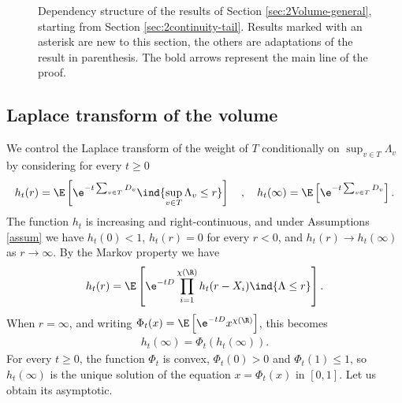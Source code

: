 \documentclass[10pt,a4paper]{article}
\begin{document}
\begin{figure}
\begin{center}
\end{center}
\caption{Dependency structure of the results of Section \ref{sec:2Volume-general}, starting from Section \ref{sec:2continuity-tail}. Results marked with an asterisk are new to this section, the others are adaptations of the result in parenthesis. The bold arrows represent the main line of the proof.}
\label{fig:structure-sec-volume}
\end{figure}





\subsection{Laplace transform of the volume}
\label{sec:2Laplace-volume-without-displacement}


We control the Laplace transform of the weight of $T$ conditionally on $\sup_{v\in T} \Lambda_v$ by considering for every $t\geq 0$
\[h_t(r) = \E\left[ \e^{-t \sum_{v\in T} D_v} \ind{\sup_{v\in T} \Lambda_v \leq r}\right] \quad , \quad h_t(\infty) = \E\left[ \e^{-t \sum_{v\in T} D_v}\right] . \]
The function $h_t$ is increasing and right-continuous, and under Assumptions \ref{assum} we have $h_t(0)<1$, $h_t(r)=0$ for every $r<0$, and $h_t(r)\to h_t(\infty)$ as $r\to\infty$. By the Markov property we have
\begin{equation}\label{eq:2convolution-equation-1}
h_t(r) = \E\left[ \e^{-t D} \prod_{i=1}^{\chi(\R)} h_t(r-X_i) \ind{\Lambda\leq r} \right] .
\end{equation}
When $r=\infty$, and writing $\Phi_t(x) = \E\left[\e^{-tD} x^{\chi(\R)}\right]$, this becomes 
\begin{align}\label{eq:2htinf-point-fixe}
h_t(\infty) = \Phi_t(h_t(\infty)) .
\end{align}
For every $t\geq 0$, the function $\Phi_t$ is convex, $\Phi_t(0)>0$ and $\Phi_t(1)\leq 1$, so $h_t(\infty)$ is the unique solution of the equation $x = \Phi_t(x)$ in $[0,1]$. Let us obtain its asymptotic. 
\end{document}
